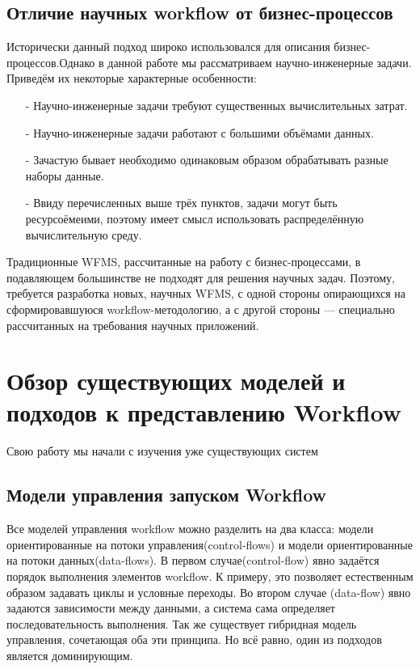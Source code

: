\documentclass[a4paper,14pt]{article}
\begin{document}
\subsection*{Отличие научных workflow от бизнес-процессов}
  Исторически данный подход широко использовался для описания бизнес-процессов.Однако в данной работе мы рассматриваем научно-инженерные задачи. Приведём их некоторые характерные особенности:
 
\begin{enumerate}
\item[-] Научно-инженерные задачи требуют существенных вычислительных затрат.
\item[-] Научно-инженерные задачи работают с большими объёмами данных.
\item[-] Зачастую бывает  необходимо одинаковым образом обрабатывать разные наборы данные.
\item[-]  Ввиду перечисленных выше трёх пунктов, задачи могут быть ресурсоёмеими, поэтому имеет смысл использовать распределённую вычислительную среду.
\end{enumerate}

Традиционные WFMS, рассчитанные на работу с бизнес-процессами, в подавляющем большинстве не подходят для решения научных задач. Поэтому, требуется разработка новых, научных WFMS, с одной стороны опирающихся на сформировавшуюся workflow-методологию, а с другой стороны — специально рассчитанных на требования научных приложений.

\section{Обзор существующих моделей и подходов к представлению Workflow}

Свою работу мы начали с изучения уже существующих систем
\subsection*{Модели управления запуском Workflow}
  Все моделей управления workflow можно разделить на два класса: модели ориентированные на потоки управления(control-flows) и модели ориентированные на потоки данных(data-flows).  
  В первом случае(control-flow) явно задаётся порядок выполнения элементов workflow. К примеру, это позволяет естественным образом задавать циклы и условные переходы.
  Во втором случае (data-flow) явно задаются зависимости между данными, а система сама определяет последовательность выполнения.
  Так же существует гибридная модель управления, сочетающая оба эти принципа. Но всё равно, один из подходов является доминирующим. 
  
\end{document}
